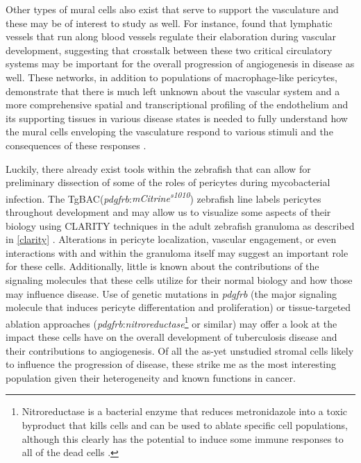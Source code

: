 Other types of mural cells also exist that serve to support the vasculature and these may be of interest to study as well. For instance, \citet{Bower2017b} found that lymphatic vessels that run along blood vessels regulate their elaboration during vascular development, suggesting that crosstalk between these two critical circulatory systems may be important for the overall progression of angiogenesis in disease as well. These networks, in addition to populations of macrophage\hyp{}like pericytes, demonstrate that there is much left unknown about the vascular system and a more comprehensive spatial and transcriptional profiling of the endothelium and its supporting tissues in various disease states is needed to fully understand how the mural cells enveloping the vasculature respond to various stimuli and the consequences of these responses \citep{Balabanov1996, Stark2013, Yamazaki2018, Kozma2021}.

Luckily, there already exist tools within the zebrafish that can allow for preliminary dissection of some of the roles of pericytes during mycobacterial infection. The TgBAC(\textit{pdgfrb}:\textit{mCitrine\textsuperscript{s1010}}) zebrafish line labels pericytes throughout development and may allow us to visualize some aspects of their biology using CLARITY techniques in the adult zebrafish granuloma as described in \autoref{clarity} \citep{Vanhollebeke2015}. Alterations in pericyte localization, vascular engagement, or even interactions with and within the granuloma itself may suggest an important role for these cells. Additionally, little is known about the contributions of the signaling molecules that these cells utilize for their normal biology and how those may influence disease. Use of genetic mutations in \textit{pdgfrb} (the major signaling molecule that induces pericyte differentation and proliferation) or tissue\hyp{}targeted ablation approaches (\textit{pdgfrb}:\textit{nitroreductase}\footnote{Nitroreductase is a bacterial enzyme that reduces metronidazole into a toxic byproduct that kills cells and can be used to ablate specific cell populations, although this clearly has the potential to induce some immune responses to all of the dead cells \citep{Sharrock2021}.} or similar) may offer a look at the impact these cells have on the overall development of tuberculosis disease and their contributions to angiogenesis. Of all the as\hyp{}yet unstudied stromal cells likely to influence the progression of disease, these strike me as the most interesting population given their heterogeneity and known functions in cancer.

